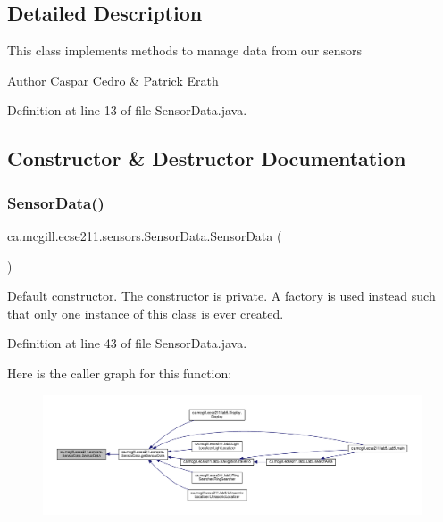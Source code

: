 \subsection{Detailed Description}
This class implements methods to manage data from our sensors

\begin{DoxyAuthor}{Author}
Caspar Cedro \& Patrick Erath 
\end{DoxyAuthor}


Definition at line 13 of file Sensor\+Data.\+java.



\subsection{Constructor \& Destructor Documentation}
\mbox{\label{classca_1_1mcgill_1_1ecse211_1_1sensors_1_1_sensor_data_a41b9929f62455a15364385a339b4b910}} 
\subsubsection{\texorpdfstring{Sensor\+Data()}{SensorData()}}
{\footnotesize\ttfamily ca.\+mcgill.\+ecse211.\+sensors.\+Sensor\+Data.\+Sensor\+Data (\begin{DoxyParamCaption}{ }\end{DoxyParamCaption})\hspace{0.3cm}{\ttfamily [protected]}}

Default constructor. The constructor is private. A factory is used instead such that only one instance of this class is ever created. 

Definition at line 43 of file Sensor\+Data.\+java.

Here is the caller graph for this function\+:
\nopagebreak
\begin{figure}[H]
\begin{center}
\leavevmode
\includegraphics[width=350pt]{classca_1_1mcgill_1_1ecse211_1_1sensors_1_1_sensor_data_a41b9929f62455a15364385a339b4b910_icgraph}
\end{center}
\end{figure}



